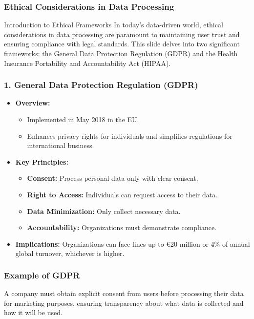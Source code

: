 \documentclass[aspectratio=169]{beamer}
\begin{document}
\begin{frame}[fragile]
    \frametitle{Ethical Considerations in Data Processing}
    \begin{block}{Introduction to Ethical Frameworks}
    In today's data-driven world, ethical considerations in data processing are paramount to maintaining user trust and ensuring compliance with legal standards. 
    This slide delves into two significant frameworks: the General Data Protection Regulation (GDPR) and the Health Insurance Portability and Accountability Act (HIPAA).
    \end{block}
\end{frame}

\begin{frame}[fragile]
    \frametitle{1. General Data Protection Regulation (GDPR)}
    \begin{itemize}
        \item \textbf{Overview:}
        \begin{itemize}
            \item Implemented in May 2018 in the EU.
            \item Enhances privacy rights for individuals and simplifies regulations for international business.
        \end{itemize}
        
        \item \textbf{Key Principles:}
        \begin{itemize}
            \item \textbf{Consent:} Process personal data only with clear consent.
            \item \textbf{Right to Access:} Individuals can request access to their data.
            \item \textbf{Data Minimization:} Only collect necessary data.
            \item \textbf{Accountability:} Organizations must demonstrate compliance.
        \end{itemize}
        
        \item \textbf{Implications:}
        Organizations can face fines up to €20 million or 4\% of annual global turnover, whichever is higher.
    \end{itemize}
\end{frame}

\begin{frame}[fragile]
    \frametitle{Example of GDPR}
    A company must obtain explicit consent from users before processing their data for marketing purposes, ensuring transparency about what data is collected and how it will be used.
\end{frame}
\end{document}
